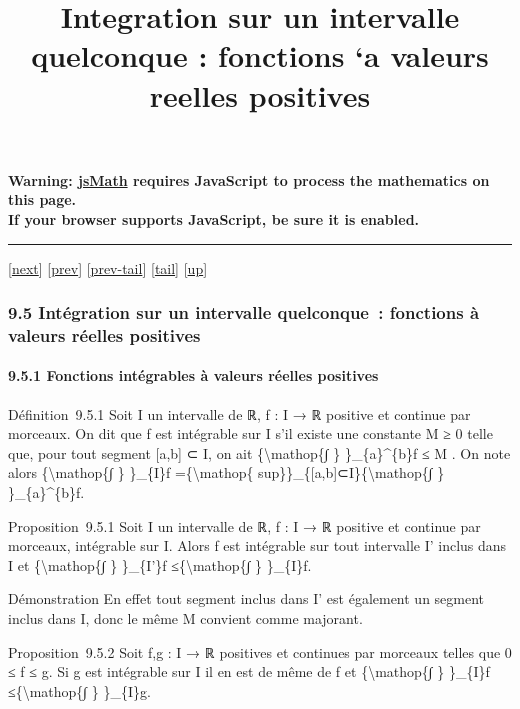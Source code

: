 \documentclass[]{article}
\title{Integration sur un intervalle quelconque : fonctions `a valeurs reelles
positives}
\author{}
\date{}
\begin{document}
\maketitle

\textbf{Warning: \href{http://www.math.union.edu/locate/jsMath}{jsMath}
requires JavaScript to process the mathematics on this page.\\ If your
browser supports JavaScript, be sure it is enabled.}

\begin{center}\rule{3in}{0.4pt}\end{center}

{[}\href{coursse55.html}{next}{]} {[}\href{coursse53.html}{prev}{]}
{[}\href{coursse53.html\#tailcoursse53.html}{prev-tail}{]}
{[}\hyperref[tailcoursse54.html]{tail}{]}
{[}\href{coursch10.html\#coursse54.html}{up}{]}

\subsubsection{9.5 Intégration sur un intervalle quelconque~: fonctions
à valeurs réelles positives}

\paragraph{9.5.1 Fonctions intégrables à valeurs réelles positives}

Définition~9.5.1 Soit I un intervalle de ℝ, f : I → ℝ positive et
continue par morceaux. On dit que f est intégrable sur I s'il existe une
constante M ≥ 0 telle que, pour tout segment {[}a,b{]} ⊂ I, on ait
\{\textbackslash{}mathop\{∫ \} \}\_\{a\}\^{}\{b\}f ≤ M . On note alors
\{\textbackslash{}mathop\{∫ \} \}\_\{I\}f =\{\textbackslash{}mathop\{
sup\}\}\_\{{[}a,b{]}⊂I\}\{\textbackslash{}mathop\{∫ \}
\}\_\{a\}\^{}\{b\}f.

Proposition~9.5.1 Soit I un intervalle de ℝ, f : I → ℝ positive et
continue par morceaux, intégrable sur I. Alors f est intégrable sur tout
intervalle I' inclus dans I et \{\textbackslash{}mathop\{∫ \}
\}\_\{I'\}f ≤\{\textbackslash{}mathop\{∫ \} \}\_\{I\}f.

Démonstration En effet tout segment inclus dans I' est également un
segment inclus dans I, donc le même M convient comme majorant.

Proposition~9.5.2 Soit f,g : I → ℝ positives et continues par morceaux
telles que 0 ≤ f ≤ g. Si g est intégrable sur I il en est de même de f
et \{\textbackslash{}mathop\{∫ \} \}\_\{I\}f
≤\{\textbackslash{}mathop\{∫ \} \}\_\{I\}g.
\end{document}
